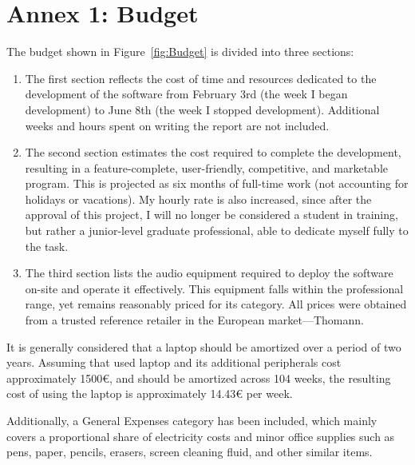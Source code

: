 \chapter{Annex 1: Budget}

The budget shown in Figure~\ref{fig:Budget} is divided into three sections:


\begin{enumerate}
	\item The first section reflects the cost of time and resources dedicated to the development of the software from February 3rd (the week I began development) to June 8th (the week I stopped development). Additional weeks and hours spent on writing the report are not included.
	
	\item The second section estimates the cost required to complete the development, resulting in a feature-complete, user-friendly, competitive, and marketable program. This is projected as six months of full-time work (not accounting for holidays or vacations). My hourly rate is also increased, since after the approval of this project, I will no longer be considered a student in training, but rather a junior-level graduate professional, able to dedicate myself fully to the task.
	
	\item The third section lists the audio equipment required to deploy the software on-site and operate it effectively. This equipment falls within the professional range, yet remains reasonably priced for its category. All prices were obtained from a trusted reference retailer in the European market—Thomann\cite{thomann}.
\end{enumerate}

It is generally considered that a laptop should be amortized over a period of two years. Assuming that used laptop and its additional peripherals cost approximately 1500€, and should be amortized across 104 weeks, the resulting cost of using the laptop is approximately 14.43€ per week.

Additionally, a General Expenses category has been included, which mainly covers a proportional share of electricity costs and minor office supplies such as pens, paper, pencils, erasers, screen cleaning fluid, and other similar items.


